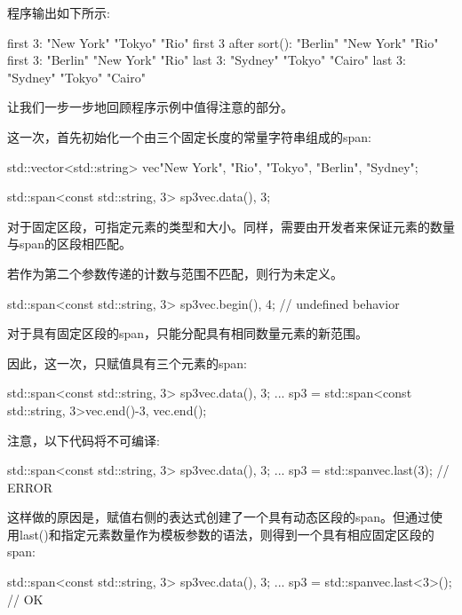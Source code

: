 程序输出如下所示:

\begin{shell}
first 3:              "New York" "Tokyo" "Rio"
first 3 after sort(): "Berlin" "New York" "Rio"
first 3: "Berlin" "New York" "Rio"
last 3: "Sydney" "Tokyo" "Cairo"
last 3: "Sydney" "Tokyo" "Cairo"
\end{shell}

让我们一步一步地回顾程序示例中值得注意的部分。


这一次，首先初始化一个由三个固定长度的常量字符串组成的span:

\begin{cpp}
std::vector<std::string> vec{"New York", "Rio", "Tokyo", "Berlin", "Sydney"};

std::span<const std::string, 3> sp3{vec.data(), 3};
\end{cpp}

对于固定区段，可指定元素的类型和大小。同样，需要由开发者来保证元素的数量与span的区段相匹配。

若作为第二个参数传递的计数与范围不匹配，则行为未定义。

\begin{cpp}
std::span<const std::string, 3> sp3{vec.begin(), 4}; // undefined behavior
\end{cpp}


对于具有固定区段的span，只能分配具有相同数量元素的新范围。

因此，这一次，只赋值具有三个元素的span:

\begin{cpp}
std::span<const std::string, 3> sp3{vec.data(), 3};
...
sp3 = std::span<const std::string, 3>{vec.end()-3, vec.end()};
\end{cpp}

注意，以下代码将不可编译:

\begin{cpp}
std::span<const std::string, 3> sp3{vec.data(), 3};
...
sp3 = std::span{vec}.last(3); // ERROR
\end{cpp}

这样做的原因是，赋值右侧的表达式创建了一个具有动态区段的span。但通过使用last()和指定元素数量作为模板参数的语法，则得到一个具有相应固定区段的span:

\begin{cpp}
std::span<const std::string, 3> sp3{vec.data(), 3};
...
sp3 = std::span{vec}.last<3>(); // OK
\end{cpp}


